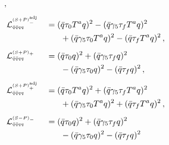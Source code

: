 \documentclass[aps,twocolumn,prd,superscriptaddress]{revtex4-2}
\begin{document}
\begin{alignat}{2}
	\,,\notag                                                                                                                                                                             \\[1ex]
	 & \mathcal{L}_{\scriptscriptstyle\bar q\bar qqq}^{\scriptscriptstyle(S+P)_-^\text{adj}} &  & = (\bar{q} \tau_0 T^a q)^2 - (\bar{q}\gamma_5 \tau_f T^a q)^2
	\notag                                                                                                                                                                                \\&&&\hspace{4ex} + (\bar q \gamma_5 \tau_0 T^a q )^2 - (\bar q \tau_f T^a q )^2
	\,,\notag                                                                                                                                                                             \\[1ex]
	 & \mathcal{L}_{\scriptscriptstyle\bar q\bar qqq}^{\scriptscriptstyle(S+P)_+}            &  & = (\bar{q} \tau_0 q)^2 + (\bar{q}\gamma_5 \tau_f q)^2
	\notag                                                                                                                                                                                \\&&&\hspace{4ex} - (\bar q \gamma_5 \tau_0 q )^2 - (\bar q \tau_f q )^2
	\,,\notag                                                                                                                                                                             \\[1ex]
	 & \mathcal{L}_{\scriptscriptstyle\bar q\bar qqq}^{\scriptscriptstyle(S+P)_+^\text{adj}} &  & = (\bar{q} \tau_0 T^a q)^2 + (\bar{q}\gamma_5 \tau_f T^a q)^2
	\notag                                                                                                                                                                                \\&&&\hspace{4ex} + (\bar q \gamma_5 \tau_0 T^a q )^2 + (\bar q \tau_f T^a q )^2
	\,,\notag                                                                                                                                                                             \\[1ex]
	 & \mathcal{L}_{\scriptscriptstyle\bar q\bar qqq}^{\scriptscriptstyle(S-P)_-}            &  & = (\bar{q} \tau_0 q)^2 + (\bar{q}\gamma_5 \tau_f q)^2
	\notag                                                                                                                                                                                \\&&&\hspace{4ex} - (\bar q \gamma_5 \tau_0 q )^2 - (\bar q \tau_f q )^2

\end{alignat}
\end{document}
